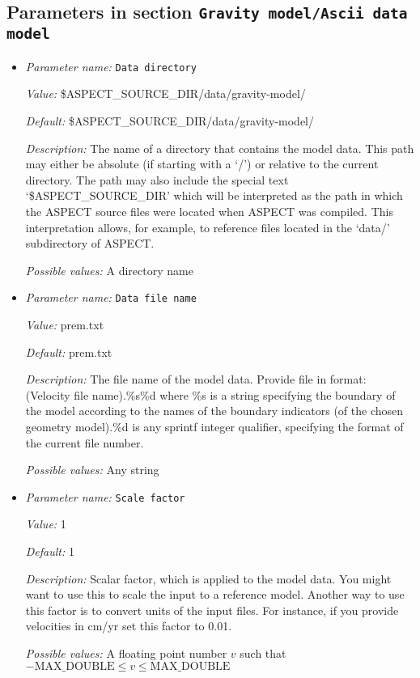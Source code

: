 \subsection{Parameters in section \tt Gravity model/Ascii data model}
\label{parameters:Gravity_20model/Ascii_20data_20model}

\begin{itemize}
\item {\it Parameter name:} {\tt Data directory}
\label{parameters:Gravity model/Ascii data model/Data directory}


{\it Value:} \$ASPECT\_SOURCE\_DIR/data/gravity-model/


{\it Default:} \$ASPECT\_SOURCE\_DIR/data/gravity-model/


{\it Description:} The name of a directory that contains the model data. This path may either be absolute (if starting with a `/') or relative to the current directory. The path may also include the special text `\$ASPECT\_SOURCE\_DIR' which will be interpreted as the path in which the ASPECT source files were located when ASPECT was compiled. This interpretation allows, for example, to reference files located in the `data/' subdirectory of ASPECT. 


{\it Possible values:} A directory name
\item {\it Parameter name:} {\tt Data file name}
\label{parameters:Gravity model/Ascii data model/Data file name}


{\it Value:} prem.txt


{\it Default:} prem.txt


{\it Description:} The file name of the model data. Provide file in format: (Velocity file name).\%s\%d where \%s is a string specifying the boundary of the model according to the names of the boundary indicators (of the chosen geometry model).\%d is any sprintf integer qualifier, specifying the format of the current file number. 


{\it Possible values:} Any string
\item {\it Parameter name:} {\tt Scale factor}
\label{parameters:Gravity model/Ascii data model/Scale factor}


{\it Value:} 1


{\it Default:} 1


{\it Description:} Scalar factor, which is applied to the model data. You might want to use this to scale the input to a reference model. Another way to use this factor is to convert units of the input files. For instance, if you provide velocities in cm/yr set this factor to 0.01.


{\it Possible values:} A floating point number $v$ such that $-\text{MAX\_DOUBLE} \leq v \leq \text{MAX\_DOUBLE}$
\end{itemize}

